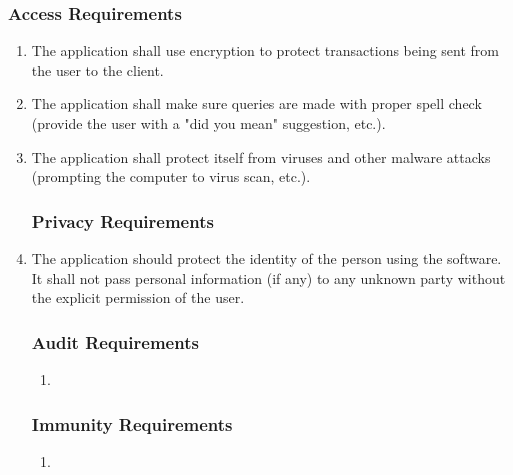 \documentclass[]{article}
\begin{document}
\subsubsection{Access Requirements}
\label{ssub:access_requirements}
\begin{enumerate}[{SR}1. ]

\subsubsection{Integrity Requirements}
\label{ssub:integrity_requirements}
	\item The application shall use encryption to protect transactions being sent from the user to the client.
	\item The application shall make sure queries are made with proper spell check (provide the user with a "did you mean" suggestion, etc.).
	\item The application shall protect itself from viruses and other malware attacks (prompting the computer to virus scan, etc.).

\subsubsection{Privacy Requirements}
\label{ssub:privacy_requirements}
	\item The application should protect the identity of the person using the software. It shall not pass personal information (if any) to any unknown party without the explicit permission of the user.

\subsubsection{Audit Requirements}
\label{ssub:audit_requirements}
\begin{enumerate}[{N/A} ]
	\item
\end{enumerate}


\subsubsection{Immunity Requirements}
\label{ssub:immunity_requirements}
\begin{enumerate}[{N/A} ]
	\item
\end{enumerate}
\end{enumerate}
\end{document}
